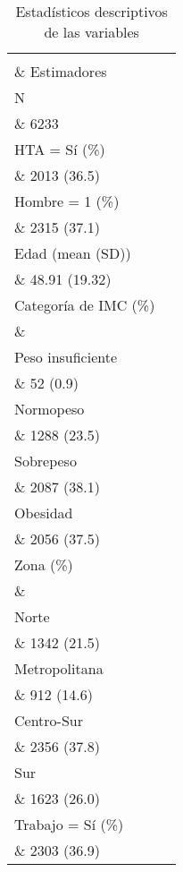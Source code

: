 \documentclass{aa}
\begin{document}
\begin{table}{}
\caption{\small Estadísticos descriptivos de las variables}
    \centering
    \tiny
\begin{tabular*}{.9\linewidth}{@{\extracolsep{\fill}}ll}
\toprule
  \\\& Estimadores \\
\midrule
N \\\& 6233\\
HTA = Sí (\%) \\\& 2013 (36.5)\\
Hombre = 1 (\%) \\\& 2315 (37.1)\\
Edad (mean (SD)) \\\& 48.91 (19.32)\\
\addlinespace
Categoría de IMC (\%) \\\& \\
\-\hspace{5mm} \tiny Peso insuficiente \\\& 52 (0.9)\\
\-\hspace{5mm} \tiny Normopeso \\\& 1288 (23.5)\\
\-\hspace{5mm} \tiny Sobrepeso \\\& 2087 (38.1)\\
\-\hspace{5mm} \tiny Obesidad \\\& 2056 (37.5)\\
\addlinespace
Zona (\%) \\\& \\
\-\hspace{5mm} \tiny Norte \\\& 1342 (21.5)\\
\-\hspace{5mm} \tiny Metropolitana \\\& 912 (14.6)\\
\-\hspace{5mm} \tiny Centro-Sur \\\& 2356 (37.8)\\
\-\hspace{5mm} \tiny Sur \\\& 1623 (26.0)\\
\addlinespace
Trabajo = Sí (\%) \\\& 2303 (36.9)\\

\end{tabular*}
\end{table}
\end{document}

